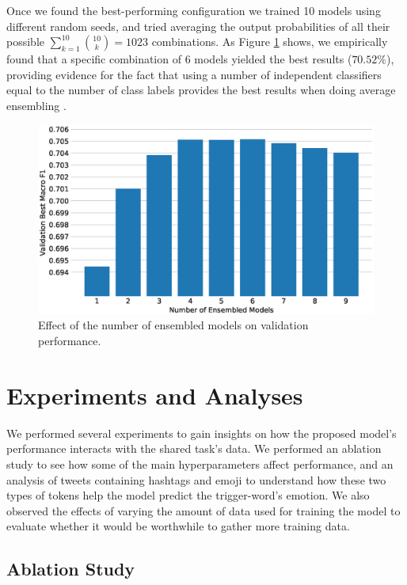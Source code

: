 \documentclass[11pt,a4paper]{article}
\begin{document}
Once we found the best-performing configuration we trained 10 models using
different random seeds, and tried averaging the output probabilities of all
their possible $\sum_{k=1}^{10}{\binom{10}{k}}=1023$ combinations. As Figure
\ref{fig:best_ensembles} shows, we empirically found that a specific combination
of $6$ models yielded the best results ($70.52\%$), providing evidence for the
fact that using a number of independent classifiers equal to the number of class
labels provides the best results when doing average ensembling
\cite{bonab2016theoretical}.


\begin{figure}[!h]
    \centering
    \includegraphics[width=\columnwidth]{images/best_ensembles.eps}
\caption{Effect of the number of ensembled models on validation performance.}
\label{fig:best_ensembles}
\end{figure}

\section{Experiments and Analyses}

We performed several experiments to gain insights on how the proposed model's
performance interacts with the shared task's data. We performed an ablation
study to see how some of the main hyperparameters affect performance, and an
analysis of tweets containing hashtags and emoji to understand how these two
types of tokens help the model predict the trigger-word's emotion. We also
observed the effects of varying the amount of data used for training the model
to evaluate whether it would be worthwhile to gather more training data.

\subsection{Ablation Study}%
\label{sub:ablation_study}
\end{document}
